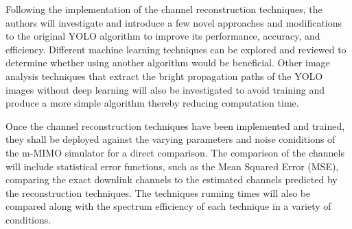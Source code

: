 Following the implementation of the channel reconstruction techniques, the authors will investigate and introduce a few novel approaches and modifications to the original YOLO algorithm to improve its performance, accuracy, and efficiency. Different machine learning techniques can be explored and reviewed to determine whether using another algorithm would be beneficial. Other image analysis techniques that extract the bright propagation paths of the YOLO images without deep learning will also be investigated to avoid training and produce a more simple algorithm thereby reducing computation time.

Once the channel reconstruction techniques have been implemented and trained, they shall be deployed against the varying parameters and noise coniditions of the m-MIMO simulator for a direct comparison. The comparison of the channels will include statistical error functions, such as the Mean Squared Error (MSE), comparing the exact downlink channels to the estimated channels predicted by the reconstruction techniques. The techniques running times will also be compared along with the spectrum efficiency of each technique in a variety of conditions.